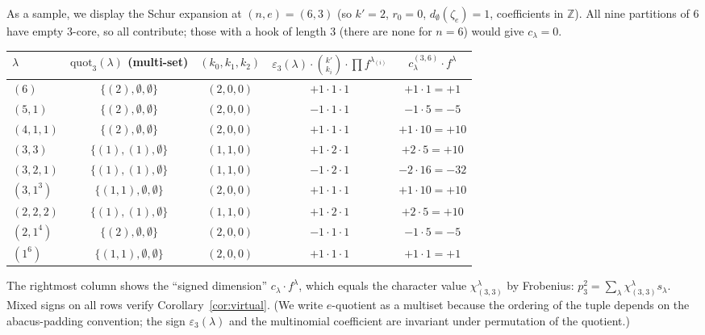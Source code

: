 \documentclass[11pt]{article}
\theoremstyle{definition}
\theoremstyle{remark}
\newcommand{\zetae}{\zeta_e}
\newcommand{\ZZ}{\mathbb{Z}}
\newcommand{\quot}{\mathrm{quot}}
\begin{document}
\smallskip
As a sample, we display the Schur expansion at $(n,e)=(6,3)$
(so $k'=2$, $r_0=0$, $d_\emptyset(\zetae)=1$, coefficients in $\ZZ$).
All nine partitions of $6$ have empty $3$-core, so all contribute; those
with a hook of length $3$ (there are none for $n=6$) would give $c_\lambda=0$.
\begin{center}
\begin{tabular}{lcccc}
\hline
$\lambda$ & $\quot_3(\lambda)$ (multi-set) & $(k_0,k_1,k_2)$ &
$\varepsilon_3(\lambda)\cdot\binom{k'}{k_i}\cdot\prod f^{\lambda_{(i)}}$ &
$c_\lambda^{(3,6)}\cdot f^\lambda$ \\
\hline
$(6)$        & $\{(2),\emptyset,\emptyset\}$ & $(2,0,0)$ & $+1\cdot 1\cdot 1$ & $+1\cdot 1=+1$ \\
$(5,1)$      & $\{(2),\emptyset,\emptyset\}$ & $(2,0,0)$ & $-1\cdot 1\cdot 1$ & $-1\cdot 5=-5$ \\
$(4,1,1)$    & $\{(2),\emptyset,\emptyset\}$ & $(2,0,0)$ & $+1\cdot 1\cdot 1$ & $+1\cdot 10=+10$ \\
$(3,3)$      & $\{(1),(1),\emptyset\}$        & $(1,1,0)$ & $+1\cdot 2\cdot 1$ & $+2\cdot 5=+10$ \\
$(3,2,1)$    & $\{(1),(1),\emptyset\}$        & $(1,1,0)$ & $-1\cdot 2\cdot 1$ & $-2\cdot 16=-32$ \\
$(3,1^{3})$  & $\{(1,1),\emptyset,\emptyset\}$& $(2,0,0)$ & $+1\cdot 1\cdot 1$ & $+1\cdot 10=+10$ \\
$(2,2,2)$    & $\{(1),(1),\emptyset\}$        & $(1,1,0)$ & $+1\cdot 2\cdot 1$ & $+2\cdot 5=+10$ \\
$(2,1^{4})$  & $\{(2),\emptyset,\emptyset\}$  & $(2,0,0)$ & $-1\cdot 1\cdot 1$ & $-1\cdot 5=-5$ \\
$(1^{6})$    & $\{(1,1),\emptyset,\emptyset\}$& $(2,0,0)$ & $+1\cdot 1\cdot 1$ & $+1\cdot 1=+1$ \\
\hline
\end{tabular}
\end{center}
The rightmost column shows the ``signed dimension'' $c_\lambda\cdot f^\lambda$,
which equals the character value $\chi^\lambda_{(3,3)}$ by Frobenius:
$p_3^2=\sum_\lambda\chi^\lambda_{(3,3)}s_\lambda$. Mixed signs on all rows
verify Corollary~\ref{cor:virtual}. (We write $e$-quotient as a multiset
because the ordering of the tuple depends on the abacus-padding convention;
the sign $\varepsilon_3(\lambda)$ and the multinomial coefficient are
invariant under permutation of the quotient.)
\end{document}
